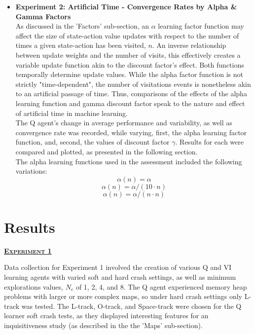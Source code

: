 \documentclass[12pt, letter]{article}
\newlength{\remaining}
\newcommand{\titleline}[1]{%
\setlength{\remaining}{\textwidth-\widthof{\textsc{#1}}}
\noindent\underline{\textsc{\textbf{#1}}\hspace*{\remaining}}\par}
\begin{document}
\begin{itemize}
    \item \textbf{Experiment 2: Artificial Time - Convergence Rates by Alpha \& Gamma Factors} \\
    As discussed in the 'Factors' sub-section, an $\alpha$ learning factor function may affect the size of state-action value updates with respect to the number of times a given state-action has been visited, $n$.  An inverse relationship between update weights and the number of visits, this effectively creates a variable update function akin to the discount factor's effect.  Both functions temporally determine update values.  While the alpha factor function is not strictly "time-dependent", the number of visitations events is nonetheless akin to an artificial passage of time.  Thus, comparisons of the effects of the alpha learning function and gamma discount factor speak to the nature and effect of artificial time in machine learning.
    \\
    The Q agent's change in average performance and variability, as well as convergence rate was recorded, while varying, first, the alpha learning factor function, and, second, the values of discount factor $\gamma$.  Results for each were compared and plotted, as presented in the following section.
    \\
    The alpha learning functions used in the assessment included the following variations:
    \begin{equation} \label{eq:alphaN}
        \alpha(n) = \alpha
    \end{equation}
    \begin{equation} \label{eq:alpha10N}
        \alpha(n) = \alpha /(10\cdot n)
    \end{equation}
    \begin{equation} \label{eq:alphaNN}
        \alpha(n) = \alpha /(n\cdot n)
    \end{equation}
\end{itemize}

\clearpage
\section{Results}
\titleline{Experiment 1}

Data collection for Experiment 1 involved the creation of various Q and VI learning agents with varied soft and hard crash settings, as well as minimum explorations values, $N_e$ of 1, 2, 4, and 8.  The Q agent experienced memory heap problems with larger or more complex maps, so under hard crash settings only L-track was tested.  The L-track, O-track, and Space-track were chosen for the Q learner soft crash tests, as they displayed interesting features for an inquisitiveness study (as described in the the 'Maps' sub-section).
\end{document}
